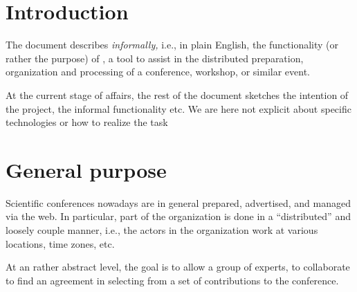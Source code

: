 \section{Introduction}
\label{sec:introduction}




The document describes \emph{informally,} i.e., in plain English, the
functionality (or rather the purpose) of \Coma, a tool to assist in the
distributed preparation, organization and processing of a conference,
workshop, or similar event.

At the current stage of affairs, the rest of the document sketches the
intention of the project, the informal functionality etc. We are here not
explicit about specific technologies or how to realize the task

\iffalse

As we intend to start \emph{early} with the \emph{integration}, the
required methods should be provided rather quickly without being (fully)
implemented (i.e., as \textit{stubs}). See also the time-line of the
project.

We provide as starting point a first implementation of the abstract syntax
(cf.\ Section~\ref{sec:abstractsyntax}) and a small textual printer in the
utilities package.



If from the perspective of a package, changes or extensions seem necessary
or desirable as far as the abstract syntax is concerned, the wish should be
uttered and justified as early as possible to all participants (and then
potentially implemented by us or the requester, if everyone agrees).

\fi


\section{General purpose}
\label{sec:purpose}

Scientific conferences nowadays are in general prepared, advertised, and
managed via the web. In particular, part of the organization is done in a
``distributed'' and loosely couple manner, i.e., the actors in the
organization work at various locations, time zones, etc.

\medskip

At an rather abstract level, the goal is to allow a group of experts, to
collaborate to find an agreement in selecting from a set of contributions
to the conference. 




